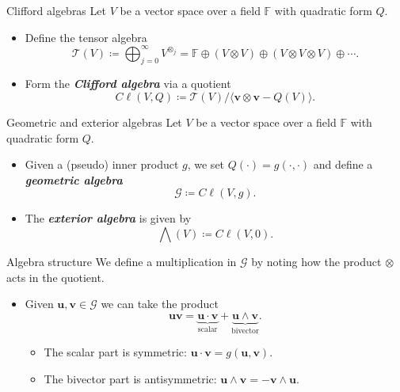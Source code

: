 \documentclass[aspectratio=169,handout]{beamer}
\newcommand\boldgreen[1]{\textcolor{lighter_csu_green}{\emph{\textbf{#1}}}}
\newcommand{\G}{\mathcal{G}}
\newcommand{\blade}[1]{\boldsymbol{#1}}
\begin{document}
\begin{frame}{Clifford algebras}
\vfill
\pause
Let $V$ be a vector space over a field $\mathbb{F}$ with quadratic form $Q$.
\begin{itemize}
        \pause
        \item Define the tensor algebra
        \[
        \mathcal{T}(V) \coloneqq \bigoplus_{j=0}^\infty V^{\otimes_j} = \mathbb{F} \oplus (V \otimes V) \oplus (V \otimes V \otimes V) \oplus \cdots.
        \]
        \pause
        \item Form the \boldgreen{Clifford algebra} via a quotient
        \[
        C\ell(V,Q) \coloneqq \mathcal{T}(V)/ \langle \blade{v} \otimes \blade{v} - Q(V)\rangle.
        \]
\end{itemize}
\vfill
\end{frame}

\begin{frame}{Geometric and exterior algebras}
\vfill
\pause
Let $V$ be a vector space over a field $\mathbb{F}$ with quadratic form $Q$.
\begin{itemize}
        \pause
        \item Given a (pseudo) inner product $g$, we set $Q(\cdot)=g(\cdot,\cdot)$ and define a \boldgreen{geometric algebra}
        \[
        \G \coloneqq C\ell(V,g).
        \]
        \pause
        \item The \boldgreen{exterior algebra} is given by
        \[
        \bigwedge(V) \coloneqq C\ell(V,0).
        \]
\end{itemize}
\vfill
\end{frame}

\begin{frame}{Algebra structure}
\vfill
\pause
We define a multiplication in $\G$ by noting how the product $\otimes$ acts in the quotient.
\begin{itemize}
    \pause
    \item Given $\blade{u}, \blade{v} \in \G$ we can take the product
    \[
    \blade{u}\blade{v} = \underbrace{\blade{u}\cdot \blade{v}}_{\textrm{scalar}} + \underbrace{\blade{u}\wedge \blade{v}}_{\textrm{bivector}}.
    \]
\begin{itemize}
    \pause
    \item The scalar part is symmetric: $\blade{u}\cdot \blade{v} = g(\blade{u},\blade{v})$.
    \pause
    \item The bivector part is antisymmetric: $\blade{u}\wedge \blade{v} = -\blade{v}\wedge \blade{u}$.
\end{itemize}
\end{itemize}
\vfill
\end{frame}
\end{document}
